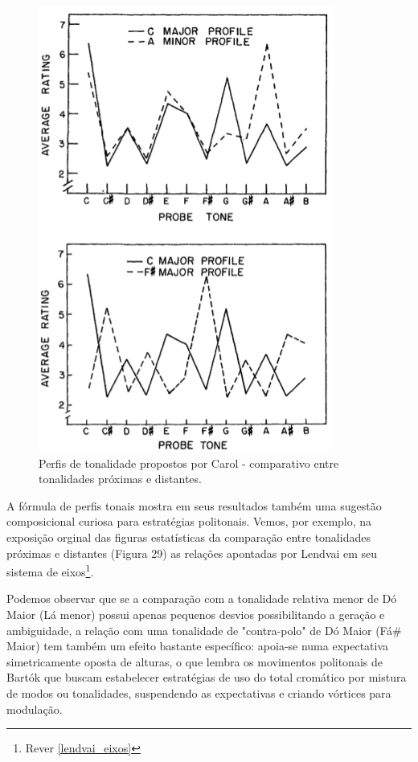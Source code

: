 \documentclass[
	12pt,				%
	openright,			%
	twoside,			%
	a4paper,			%
	english,			%
	french,				%
	spanish,			%
	brazil				%
	]{abntex2}
\begin{document}
\begin{figure}[!h]
	\caption{\label{fig_grafico}Perfis de tonalidade propostos por Carol  - comparativo entre tonalidades próximas e distantes. }
	\begin{center}
	    \includegraphics[scale=0.45]{CBMS/probeones_krumhansl_p36.png}
	\end{center}
\end{figure}


A fórmula de perfis tonais mostra em seus resultados também uma sugestão composicional curiosa para estratégias politonais. Vemos, por exemplo, na exposição orginal das figuras estatísticas da comparação entre tonalidades próximas e distantes (Figura 29) as relações apontadas por Lendvai em seu sistema de eixos\footnote{ Rever \autoref{lendvai_eixos} }. 

Podemos observar que se a comparação com a tonalidade relativa menor de Dó Maior (Lá menor) possui apenas pequenos desvios possibilitando a geração e ambiguidade, a relação com uma tonalidade de "contra-polo" de Dó Maior (Fá\# Maior) tem também um efeito bastante específico: apoia-se numa expectativa simetricamente oposta de alturas, o que lembra os movimentos politonais de Bartók que buscam estabelecer estratégias de uso do total cromático por mistura de modos ou tonalidades, suspendendo as expectativas e criando vórtices para modulação.
\end{document}
